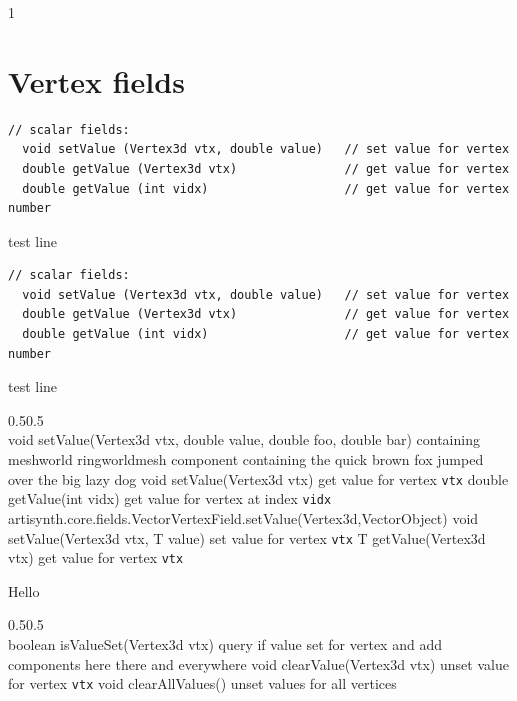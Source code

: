 1\documentclass{article}
\begin{document}
\section{Vertex fields}

\begin{lstlisting}[]
  // scalar fields:
  void setValue (Vertex3d vtx, double value)   // set value for vertex
  double getValue (Vertex3d vtx)               // get value for vertex
  double getValue (int vidx)                   // get value for vertex number
\end{lstlisting}
%
test line
%
\begin{lstlisting}[]
  // scalar fields:
  void setValue (Vertex3d vtx, double value)   // set value for vertex
  double getValue (Vertex3d vtx)               // get value for vertex
  double getValue (int vidx)                   // get value for vertex number
\end{lstlisting}
%
test line
%
\begin{methodtable}[\smallskipamount]{0.5}{0.5}
\midline
{}\\
\midline
%
%
{void setValue(\brh Vertex3d vtx, double value, double foo, \brh double bar)}%
{containing meshworld ringworldmesh component containing the quick 
brown fox jumped over the big lazy dog}
%
\methodspace{0.5em}%
%
%
{void setValue(Vertex3d vtx)}%
{get value for vertex {\tt vtx}}
%
%
{double getValue(int vidx)}%
{get value for vertex at index {\tt vidx}}
%
\midline
{}\\
\midline
%
\methodentry
{artisynth.core.fields.VectorVertexField.setValue(Vertex3d,VectorObject)}%
{void setValue(Vertex3d vtx, T value)}%
{set value for vertex {\tt vtx}}
%
%
{T getValue(Vertex3d vtx)}%
{get value for vertex {\tt vtx}}
%
\midline
\end{methodtable}
%
Hello
%
\begin{methodtable}{0.5}{0.5}
\midline
{}\\
\midline
%
%
{boolean isValueSet(Vertex3d vtx)}%
{query if value set for vertex and add components here there and everywhere}
%
%
{void clearValue(Vertex3d vtx)}%
{unset value for vertex {\tt vtx}}
%
%
{void clearAllValues()}%
{unset values for all vertices}
%
\midline
\end{methodtable}
\end{document}
